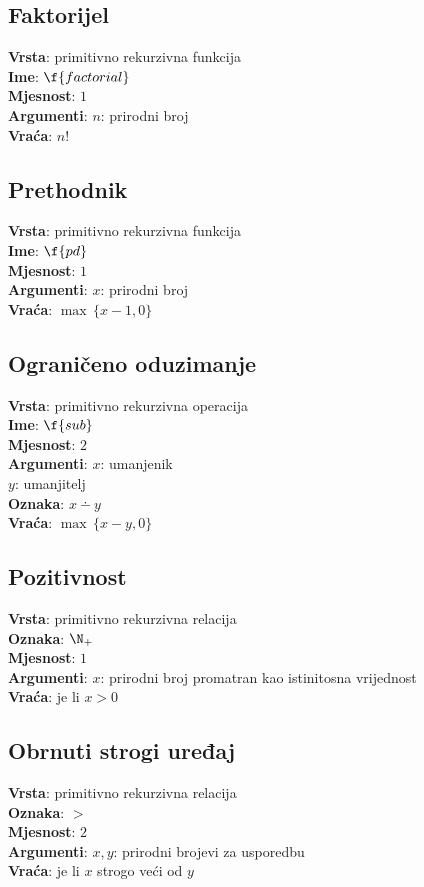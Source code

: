 \subsection{Faktorijel}
\textbf{Vrsta}: primitivno rekurzivna funkcija\\
\textbf{Ime}: $\f{factorial}$\\
\textbf{Mjesnost}: $1$\\
\textbf{Argumenti}: $n$: prirodni broj\\
\textbf{Vraća}: $n!$

\subsection{Prethodnik}
\textbf{Vrsta}: primitivno rekurzivna funkcija\\
\textbf{Ime}: $\f{pd}$\\
\textbf{Mjesnost}: $1$\\
\textbf{Argumenti}: $x$: prirodni broj\\
\textbf{Vraća}: $\max\,\{x-1,0\}$

\subsection{Ograničeno oduzimanje}
\textbf{Vrsta}: primitivno rekurzivna operacija\\
\textbf{Ime}: $\f{sub}$\\
\textbf{Mjesnost}: $2$\\
\textbf{Argumenti}: $x$: umanjenik\\
$y$: umanjitelj\\
\textbf{Oznaka}: $x\dotminus y$\\
\textbf{Vraća}: $\max\,\{x-y,0\}$

\subsection{Pozitivnost}
\textbf{Vrsta}: primitivno rekurzivna relacija\\
\textbf{Oznaka}: $\N_+$\\
\textbf{Mjesnost}: $1$\\
\textbf{Argumenti}: $x$: prirodni broj promatran kao istinitosna vrijednost\\
\textbf{Vraća}: je li $x>0$

\subsection{Obrnuti strogi uređaj}
\textbf{Vrsta}: primitivno rekurzivna relacija\\
\textbf{Oznaka}: $>$\\
\textbf{Mjesnost}: $2$\\
\textbf{Argumenti}: $x,y$: prirodni brojevi za usporedbu\\
\textbf{Vraća}: je li $x$ strogo veći od $y$

